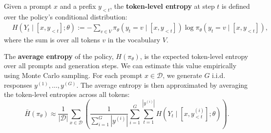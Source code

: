 Given a prompt $x$ and a prefix $y_{<t}$, the \textbf{token-level entropy} at step $t$ is defined over the policy's conditional distribution:
\begin{align*}
&H(Y_t \mid [x, y_{<t}]; \theta) := 
-\sum_{v \in V} \pi_\theta(y_t = v \mid [x, y_{<t}]) \log \pi_\theta(y_t = v \mid [x, y_{<t}]),
\end{align*}
where the sum is over all tokens $v$ in the vocabulary $V$.

The \textbf{average entropy} of the policy, $H(\pi_\theta)$, is the expected token-level entropy over all prompts and generation steps. We can estimate this value empirically using Monte Carlo sampling. For each prompt $x \in \mathcal{D}$, we generate $G$ i.i.d. responses $y^{(1)}, \dots, y^{(G)}$. The average entropy is then approximated by averaging the token-level entropies across all tokens:
$$
\bar{H}(\pi_\theta) \approx \frac{1}{|\mathcal{D}|} \sum_{x \in \mathcal{D}} \left( \frac{1}{\sum_{i=1}^G |y^{(i)}|}{\sum_{i=1}^G \sum_{t=1}^{|y^{(i)}|} H(Y_t \mid [x, y^{(i)}_{<t}]; \theta)} \right).
$$